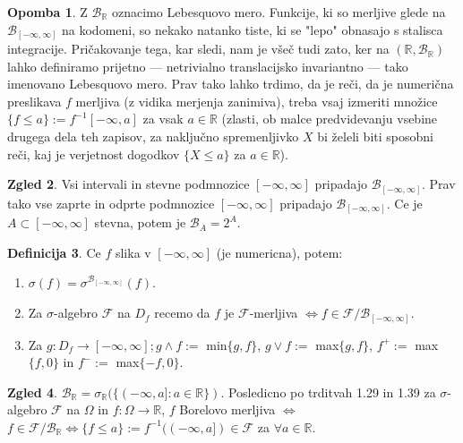 \documentclass[a4paper,12pt]{article}
\theoremstyle{definition} %
\newtheorem{definicija}{Definicija}[section]
\newtheorem{zgled}[definicija]{Zgled}
\newtheorem{opomba}[definicija]{Opomba}
\theoremstyle{plain} %
\newcommand{\R}{\mathbb{R}}
\newcommand{\F}{\mathcal{F}}
\begin{document}
            \begin{opomba}
                Z $\mathcal{B}_\R$ oznacimo Lebesquovo mero. Funkcije, ki so merljive glede na $\mathcal{B}_{[-\infty, \infty]}$ na kodomeni, so nekako natanko tiste, ki se "lepo" obnasajo s stalisca integracije. Pričakovanje tega, kar sledi, nam je všeč tudi zato, ker na $(\R, \mathcal{B}_\R)$ lahko definiramo prijetno — netrivialno translacijsko invariantno — tako imenovano Lebesquovo mero. Prav tako lahko trdimo, da je reči, da je numerična preslikava $f$ merljiva (z vidika merjenja zanimiva), treba vsaj izmeriti množice $\{f \leq a\}:= f^{-1}{[-\infty, a]}$ za vsak $a \in \R$ (zlasti, ob malce predvidevanju vsebine drugega dela teh zapisov, za naključno spremenljivko $X$ bi želeli biti sposobni reči, kaj je verjetnost dogodkov $\{X \leq a\}$ za $a \in \R$).
            \end{opomba}

            \begin{zgled}
                Vsi intervali in stevne podmnozice $[-\infty, \infty]$ pripadajo $\mathcal{B}_{[-\infty, \infty]}$. Prav tako vse zaprte in odprte podmnozice $[-\infty, \infty]$ pripadajo $\mathcal{B}_{[-\infty, \infty]}$. Ce je $A \subset [-\infty, \infty]$ stevna, potem je $\mathcal{B}_A = 2^A.$
            \end{zgled}
        
            \begin{definicija}
                Ce $f$ slika v $[-\infty, \infty]$ (je numericna), potem: 
                \begin{enumerate}
                    \item $\sigma(f) = \sigma^{\mathcal{B}_{[-\infty, \infty]}}(f)$.
                    \item Za $\sigma$-algebro $\F$ na $D_f$ recemo da $f$ je  $\F$-merljiva $\iff f \in \F/\mathcal{B}_{[-\infty, \infty]}$.
                    \item Za $g:D_f \rightarrow [-\infty, \infty]; g \land f :=$ min$\{g, f\}$,  $g \lor f:=$ max$\{g, f\}$, $f^+:=$ max$\{f, 0\}$ in  $f^-:=$ max$\{-f, 0\}$.
                \end{enumerate}
            \end{definicija}

            \begin{zgled}
                    $\mathcal{B}_\R = \sigma_\R(\{(-\infty, a]: a \in \R\})$. Posledicno po trditvah 1.29 in 1.39 za $\sigma$-algebro $\F$ na $\Omega$ in $f:\Omega \rightarrow \R$, $f$ Borelovo merljiva $\iff$ $f \in \F/\mathcal{B}_\R \iff \{f \leq a\}:= f^{-1}((-\infty, a]) \in \F$ za $\forall a \in \R.$
            \end{zgled}
\end{document}
